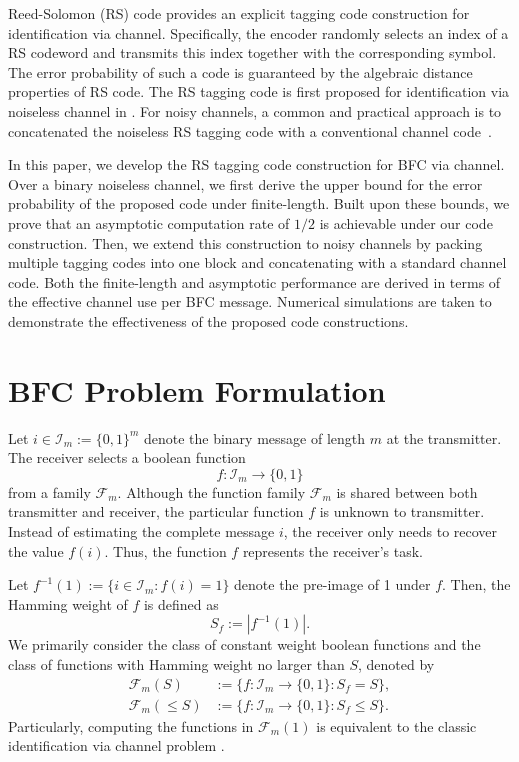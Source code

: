 Reed-Solomon (RS) code provides an explicit tagging code construction for identification via channel. Specifically, the encoder randomly selects an index of a RS codeword and transmits this index together with the corresponding symbol. The error probability of such a code is guaranteed by the algebraic distance properties of RS code. The RS tagging code is first proposed for identification via noiseless channel in \cite{RS-tagging}. For noisy channels, a common and practical approach is to concatenated the noiseless RS tagging code with a conventional channel code~\cite{RS-tagging,ID-tutorial}.

In this paper, we develop the RS tagging code construction for BFC via channel. Over a binary noiseless channel, we first derive the upper bound for the error probability of the proposed code under finite-length. Built upon these bounds, we prove that an asymptotic computation rate of $1/2$ is achievable under our code construction. Then, we extend this construction to noisy channels by packing multiple tagging codes into one block and concatenating with a standard channel code. Both the finite-length and asymptotic performance are derived in terms of the effective channel use per BFC message. Numerical simulations are taken to demonstrate the effectiveness of the proposed code constructions.


\section{BFC Problem Formulation}
\label{sec:system_model}
Let $i\in\mathcal{I}_m:=\{0,1\}^m$ denote the binary message of length $m$ at the transmitter. The receiver selects a boolean function
\begin{equation}
    f:\mathcal{I}_m\to \{0,1\}
\end{equation}
from a family $\mathcal{F}_m$. Although the function family $\mathcal{F}_m$ is shared between both transmitter and receiver, the particular function $f$ is unknown to transmitter. Instead of estimating the complete message $i$, the receiver only needs to recover the value $f(i)$. Thus, the function $f$ represents the receiver's task.

Let $f^{-1}(1):=\{i\in\mathcal{I}_m:f(i)=1\}$ denote the pre-image of 1 under $f$. Then, the Hamming weight of $f$ is defined as
\begin{equation}
    S_f:=|f^{-1}(1)|.
\end{equation}
We primarily consider the class of constant weight boolean functions and the class of functions with Hamming weight no larger than $S$, denoted by
\begin{equation}
    \begin{split}
    \mathcal{F}_m(S) & :=\{f:\mathcal{I}_m\to \{0,1\}:S_f= S\},\\
    \mathcal{F}_m(\leq S) & :=\{f:\mathcal{I}_m\to \{0,1\}:S_f\leq S\}.
    \end{split}
\end{equation}
Particularly, computing the functions in $\mathcal{F}_m(1)$ is equivalent to the classic identification via channel problem \cite{ID}.

